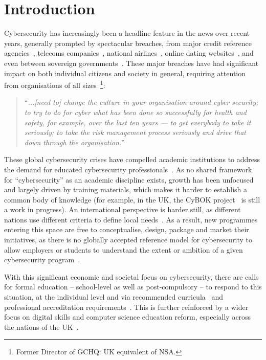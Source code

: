 \documentclass[conference]{IEEEtran}
\begin{document}
\section{Introduction}

Cybersecurity has increasingly been a headline feature in the news over recent years, generally prompted by spectacular breaches, from major credit reference agencies~\cite{equifax2017}, telecoms companies~\cite{talktalk2016}, national airlines~\cite{BritishAirways2018a}, online dating websites~\cite{ashleymadison2015}, and even between sovereign governments~\cite{ncsc2018}. These major breaches have had significant impact on both individual citizens and society in general, requiring attention from organisations of all sizes~\cite{Hannigan2019a}\footnote{Former Director of GCHQ: UK equivalent of NSA.}:
\begin{quote}
``{\emph{...[need to] change the culture in your organisation around cyber security; to try to do for cyber what has been done so successfully for health and safety, for example, over the last ten years --- to get everybody to take it seriously; to take the risk management process seriously and drive that down through the organisation.}}''
\end{quote}
\noindent
These global cybersecurity crises have compelled academic institutions to address the demand for educated cybersecurity professionals~\cite{McGettrick2013}. As no shared framework for ``cybersecurity'' as an academic discipline exists, growth has been unfocused and largely driven by training materials, which makes it harder to establish a common body of knowledge (for example, in the UK, the CyBOK project~\cite{Bristol2019a} is still a work in progress). An international perspective is harder still, as different nations use different criteria to define local needs~\cite{schneider2013}. As a result, new programmes entering this space are free to conceptualise, design, package and market their initiatives, as there is no globally accepted reference model for cybersecurity to allow employers or students to understand the extent or ambition of a given cybersecurity program~\cite{conklin-et-al:2014,Parrishetal2018a}.

With this significant economic and societal focus on cybersecurity, there are calls for formal education -- school-level as well as post-compulsory -- to respond to this situation, at the individual level and via recommended curricula~\cite{mcgettrick-et-al:sigcse2014,ACM2017b} and professional accreditation requirements~\cite{BCS2018a}. This is further reinforced by a wider focus on digital skills and computer science education reform, especially across the nations of the UK~\cite{brown-et-al:toce2014,murphy-et-al:programming2017,tryfonas+crick:petra2018}. 
\end{document}
